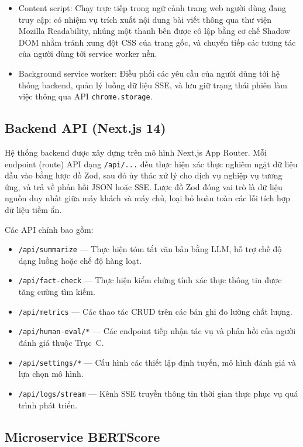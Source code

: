\begin{itemize}
  \item Content script: Chạy trực tiếp trong ngữ cảnh trang web người dùng đang truy cập; có nhiệm vụ trích xuất nội dung bài viết thông qua thư viện Mozilla Readability, nhúng một thanh bên được cô lập bằng cơ chế Shadow DOM nhằm tránh xung đột CSS của trang gốc, và chuyển tiếp các tương tác của người dùng tới service worker nền.
  \item Background service worker: Điều phối các yêu cầu của người dùng tới hệ thống backend, quản lý luồng dữ liệu SSE, và lưu giữ trạng thái phiên làm việc thông qua API \texttt{chrome.storage}.
\end{itemize}

\subsection{Backend API (Next.js 14)}

Hệ thống backend được xây dựng trên mô hình Next.js App Router. Mỗi endpoint (route) API dạng \texttt{/api/...} 
đều thực hiện xác thực nghiêm ngặt dữ liệu đầu vào bằng lược đồ Zod, 
sau đó ủy thác xử lý cho dịch vụ nghiệp vụ tương ứng, 
và trả về phản hồi JSON hoặc SSE. Lược đồ Zod đóng vai trò là dữ liệu nguồn duy nhất giữa máy khách và máy chủ, loại bỏ hoàn toàn các lỗi tích hợp dữ liệu tiềm ẩn.

Các API chính bao gồm:

\begin{itemize}
  \item \texttt{/api/summarize} --- Thực hiện tóm tắt văn bản bằng LLM, hỗ trợ chế độ dạng luồng hoặc chế độ hàng loạt.
  \item \texttt{/api/fact-check} --- Thực hiện kiểm chứng tính xác thực thông tin được tăng cường tìm kiếm.
  \item \texttt{/api/metrics} --- Các thao tác CRUD trên các bản ghi đo lường chất lượng.
  \item \texttt{/api/human-eval/*} --- Các endpoint tiếp nhận tác vụ và phản hồi của người đánh giá thuộc Trục~C.
  \item \texttt{/api/settings/*} --- Cấu hình các thiết lập định tuyến, mô hình đánh giá và lựa chọn mô hình.
  \item \texttt{/api/logs/stream} --- Kênh SSE truyền thông tin thời gian thực phục vụ quá trình phát triển.
\end{itemize}


\subsection{Microservice BERTScore}

